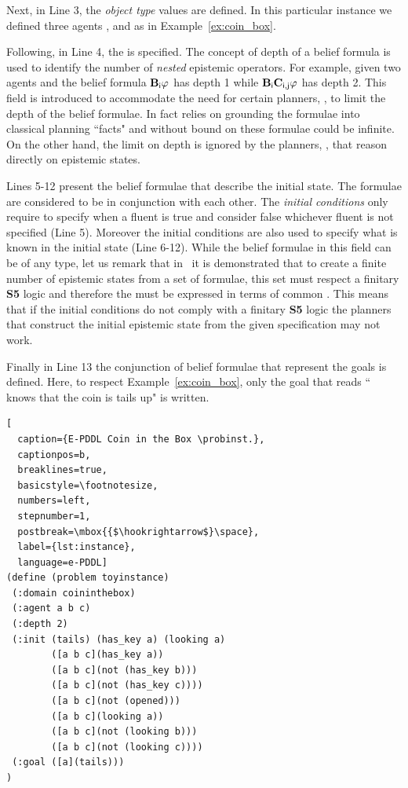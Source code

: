 Next, in Line 3, the \emph{object type}  values are defined.
In this particular instance we defined three agents ,  and  as in Example~\ref{ex:coin_box}.

Following, in Line 4, the  is specified.
The concept of depth of a belief formula is used to identify the number of \emph{nested} epistemic operators.
For example, given two agents  and  the belief formula $\textbf{B}_{\mathsf{i}}\varphi$ has depth 1 while $\textbf{B}_{\mathsf{i}}\textbf{C}_{\mathsf{i,j}}\varphi$  has depth 2.
This field is introduced to accommodate the need for certain planners, \eg \rpmep, to limit the depth of the belief formulae.
In fact \rpmep relies on grounding the formulae into classical planning ``facts" and without bound on these formulae could be infinite.
On the other hand, the limit on depth is ignored by the planners, \eg \EFP, that reason directly on epistemic states.

Lines 5-12 present the belief formulae that describe the initial state. The formulae are considered to be in conjunction with each other.
The \emph{initial conditions} only require to specify when a fluent is true and consider false whichever fluent is not specified (Line 5).
Moreover the initial conditions are also used to specify what is known in the initial state (Line 6-12).
While the belief formulae in this field can be of any type, let us remark that in~\cite{son2014finitary} it is demonstrated that to create a finite number of epistemic states from a set of formulae, this set must respect a finitary \textbf{S5} logic and therefore the \knobel must be expressed in terms of common \knobel.
This means that if the initial conditions do not comply with a finitary \textbf{S5} logic the planners that construct the initial epistemic state from the given specification may not work.

Finally in Line 13 the conjunction of belief formulae that represent the goals is defined.
Here, to respect Example~\ref{ex:coin_box}, only the goal that reads `` knows that the coin is tails up" is written.
\begin{lstlisting}[
  caption={E-PDDL Coin in the Box \probinst.},
  captionpos=b,
  breaklines=true,
  basicstyle=\footnotesize,
  numbers=left,
  stepnumber=1,
  postbreak=\mbox{{$\hookrightarrow$}\space},
  label={lst:instance},
  language=e-PDDL]
(define (problem toyinstance)
 (:domain coininthebox)
 (:agent a b c)
 (:depth 2)
 (:init (tails) (has_key a) (looking a)
        ([a b c](has_key a))
        ([a b c](not (has_key b)))
        ([a b c](not (has_key c))))
        ([a b c](not (opened)))
        ([a b c](looking a))
        ([a b c](not (looking b)))
        ([a b c](not (looking c))))
 (:goal ([a](tails)))
)\end{lstlisting}

